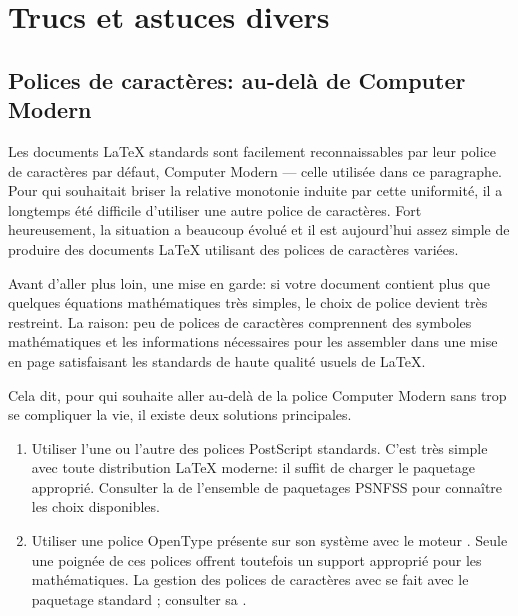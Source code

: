 \chapter{Trucs et astuces divers}
\label{chap:trucs}


\section{Polices de caractères: au-delà de Computer Modern}
\label{sec:trucs:police}

{\CM%
  Les documents {\LaTeX} standards sont facilement reconnaissables par
  leur police de caractères par défaut, Computer Modern --- celle
  utilisée dans ce paragraphe. Pour qui souhaitait briser la relative
  monotonie induite par cette uniformité, il a longtemps été difficile
  d'utiliser une autre police de caractères. Fort heureusement, la
  situation a beaucoup évolué et il est aujourd'hui assez simple de
  produire des documents {\LaTeX} utilisant des polices de caractères
  variées.}

Avant d'aller plus loin, une mise en garde: si votre document contient
plus que quelques équations mathématiques très simples, le choix de
police devient très restreint. La raison: peu de polices de caractères
comprennent des symboles mathématiques et les informations nécessaires
pour les assembler dans une mise en page satisfaisant les standards de
haute qualité usuels de {\LaTeX}.

Cela dit, pour qui souhaite aller au-delà de la police Computer Modern
sans trop se compliquer la vie, il existe deux solutions principales.

\begin{enumerate}
\item Utiliser l'une ou l'autre des polices PostScript standards.
  C'est très simple avec toute distribution {\LaTeX} moderne: il
  suffit de charger le paquetage approprié. Consulter la %
  de l'ensemble de paquetages PSNFSS pour connaître les choix
  disponibles.
\item Utiliser une police OpenType présente sur son système avec le
  moteur {\XeLaTeX}. Seule une poignée de ces polices offrent
  toutefois un support approprié pour les mathématiques. La gestion
  des polices de caractères avec {\XeLaTeX} se fait avec le paquetage
  standard ; consulter sa %
  .
\end{enumerate}

